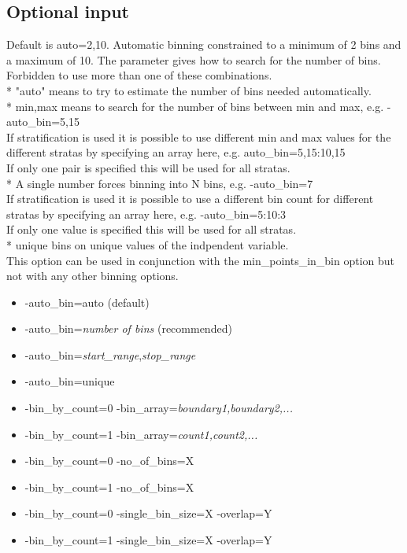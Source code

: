 \subsection{Optional input}
\begin{optionlist}
Default is auto=2,10. Automatic binning constrained to a minimum of 2 bins and a maximum of 10. The parameter gives how to search for the number of bins. Forbidden to use more than one of these combinations.\\
* "auto" means to try to estimate the number of bins needed automatically.\\
* min,max means to search for the number of bins between min and max, e.g. -auto\_bin=5,15\\
If stratification is used it is possible to use different min and max values for the different stratas by specifying an array here, e.g. 
auto\_bin=5,15:10,15\\
If only one pair is specified this will be used for all stratas.\\
* A single number forces binning into N bins, e.g. -auto\_bin=7\\
If stratification is used it is possible to use a different bin count for different stratas by specifying an array here, e.g. -auto\_bin=5:10:3\\
If only one value is specified this will be used for all stratas.\\
* unique bins on unique values of the indpendent variable.\\
This option can be used in conjunction with the min\_points\_in\_bin option but not with any other binning options.
\begin{itemize}
	\item -auto\_bin=auto (default)
	\item -auto\_bin=\emph{number of bins} (recommended)
	\item -auto\_bin=\emph{start\_range},\emph{stop\_range}
	\item -auto\_bin=unique
	\item -bin\_by\_count=0 -bin\_array=\emph{boundary1,boundary2,...}
	\item -bin\_by\_count=1 -bin\_array=\emph{count1,count2,...}
	\item -bin\_by\_count=0 -no\_of\_bins=X
	\item -bin\_by\_count=1 -no\_of\_bins=X
	\item -bin\_by\_count=0 -single\_bin\_size=X -overlap=Y
	\item -bin\_by\_count=1 -single\_bin\_size=X -overlap=Y

\end{itemize}
\end{optionlist}
